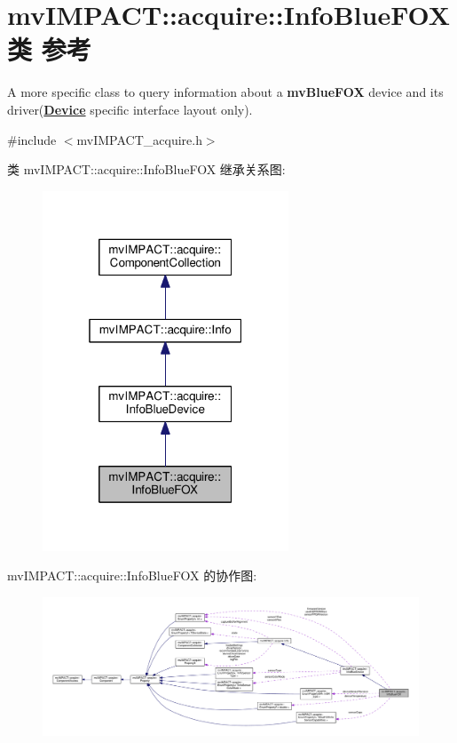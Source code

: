 \hypertarget{classmv_i_m_p_a_c_t_1_1acquire_1_1_info_blue_f_o_x}{\section{mv\+I\+M\+P\+A\+C\+T\+:\+:acquire\+:\+:Info\+Blue\+F\+O\+X类 参考}
\label{classmv_i_m_p_a_c_t_1_1acquire_1_1_info_blue_f_o_x}
}


A more specific class to query information about a {\bfseries mv\+Blue\+F\+O\+X} device and its driver({\bfseries \hyperlink{classmv_i_m_p_a_c_t_1_1acquire_1_1_device}{Device}} specific interface layout only).  




{\ttfamily \#include $<$mv\+I\+M\+P\+A\+C\+T\+\_\+acquire.\+h$>$}



类 mv\+I\+M\+P\+A\+C\+T\+:\+:acquire\+:\+:Info\+Blue\+F\+O\+X 继承关系图\+:
\nopagebreak
\begin{figure}[H]
\begin{center}
\leavevmode
\includegraphics[width=208pt]{classmv_i_m_p_a_c_t_1_1acquire_1_1_info_blue_f_o_x__inherit__graph}
\end{center}
\end{figure}


mv\+I\+M\+P\+A\+C\+T\+:\+:acquire\+:\+:Info\+Blue\+F\+O\+X 的协作图\+:
\nopagebreak
\begin{figure}[H]
\begin{center}
\leavevmode
\includegraphics[width=350pt]{classmv_i_m_p_a_c_t_1_1acquire_1_1_info_blue_f_o_x__coll__graph}
\end{center}
\end{figure}
